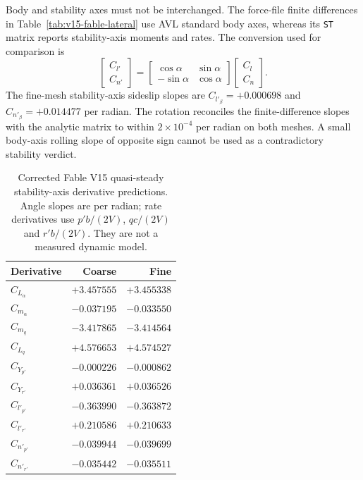 \documentclass[11pt,a4paper]{article}
\begin{document}
Body and stability axes must not be interchanged. The force-file finite
differences in Table~\ref{tab:v15-fable-lateral} use AVL standard body axes,
whereas its \texttt{ST} matrix reports stability-axis moments and rates.
The conversion used for comparison is
\begin{equation}
\begin{bmatrix}C_{l'}\\C_{n'}\end{bmatrix}=
\begin{bmatrix}\cos\alpha&\sin\alpha\\-\sin\alpha&\cos\alpha\end{bmatrix}
\begin{bmatrix}C_l\\C_n\end{bmatrix}.
\end{equation}
The fine-mesh stability-axis sideslip slopes are $C_{l'_\beta}=+0.000698$ and $C_{n'_\beta}=+0.014477$ per radian. The rotation reconciles the finite-difference slopes with the analytic matrix to within $2\times10^{-4}$ per radian on both meshes. A small body-axis rolling slope of opposite sign cannot be used as a contradictory stability verdict.

\begin{table}[p]\centering\small
\caption{Corrected Fable V15 quasi-steady stability-axis derivative predictions. Angle slopes are per radian; rate derivatives use $p'b/(2V)$, $qc/(2V)$ and $r'b/(2V)$. They are not a measured dynamic model.}
\label{tab:fable-corrected-rates}
\begin{tabular}{lrr}\toprule
Derivative & Coarse & Fine\\\midrule
$C_{L_\alpha}$ & $+3.457555$ & $+3.455338$\\
$C_{m_\alpha}$ & $-0.037195$ & $-0.033550$\\
$C_{m_q}$ & $-3.417865$ & $-3.414564$\\
$C_{L_q}$ & $+4.576653$ & $+4.574527$\\
$C_{Y_{p\prime}}$ & $-0.000226$ & $-0.000862$\\
$C_{Y_{r\prime}}$ & $+0.036361$ & $+0.036526$\\
$C_{l\prime_{p\prime}}$ & $-0.363990$ & $-0.363872$\\
$C_{l\prime_{r\prime}}$ & $+0.210586$ & $+0.210633$\\
$C_{n\prime_{p\prime}}$ & $-0.039944$ & $-0.039699$\\
$C_{n\prime_{r\prime}}$ & $-0.035442$ & $-0.035511$\\
\bottomrule\end{tabular}\end{table}
\end{document}
